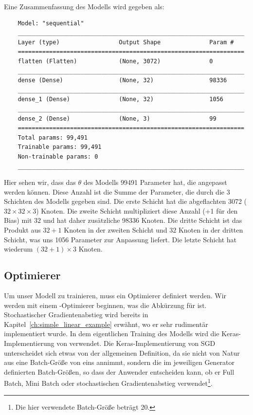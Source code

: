 Eine Zusammenfassung des Modells wird gegeben als:

\begin{lstlisting}
    Model: "sequential"
    _________________________________________________________________
    Layer (type)                 Output Shape              Param #   
    =================================================================
    flatten (Flatten)            (None, 3072)              0         
    _________________________________________________________________
    dense (Dense)                (None, 32)                98336     
    _________________________________________________________________
    dense_1 (Dense)              (None, 32)                1056      
    _________________________________________________________________
    dense_2 (Dense)              (None, 3)                 99        
    =================================================================
    Total params: 99,491
    Trainable params: 99,491
    Non-trainable params: 0
    _________________________________________________________________
\end{lstlisting}

Hier sehen wir, dass das $\theta$ des Modells 99491 Parameter hat, die angepasst werden können.
Diese Anzahl ist die Summe der Parameter, die durch die 3 Schichten des Modells gegeben sind.
Die erste Schicht hat die abgeflachten 3072 ($32 \times 32 \times 3$) Knoten.
Die zweite Schicht multipliziert diese Anzahl (+1 für den Bias) mit $32$ und hat daher zusätzliche 98336 Knoten.
Die dritte Schicht ist das Produkt aus $32 + 1$ Knoten in der zweiten Schicht und $32$ Knoten in der dritten Schicht, was uns 1056 Parameter zur Anpassung liefert.
Die letzte Schicht hat wiederum $(32 + 1) \times 3$ Knoten.

\subsection{Optimierer} \label{ch:optimizer}

Um unser Modell zu trainieren, muss ein Optimierer definiert werden.
Wir werden mit einem -Optimierer beginnen, was die Abkürzung für  ist.
Stochastischer Gradientenabstieg wird bereits in Kapitel~\ref{ch:simple_linear_example} erwähnt, wo er sehr rudimentär implementiert wurde. In dem eigentlichen Training des Modells wird die Keras-Implementierung von  verwendet.
Die Keras-Implementierung von SGD unterscheidet sich etwas von der allgemeinen Definition, da sie nicht von Natur aus eine Batch-Größe von eins annimmt, sondern die im jeweiligen Generator definierten Batch-Größen, so dass der Anwender entscheiden kann, ob er Full Batch, Mini Batch oder stochastischen Gradientenabstieg verwendet\footnote{Die hier verwendete Batch-Größe beträgt 20.}.

